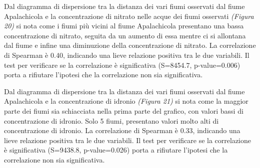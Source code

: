 \documentclass{article} %
\begin{document}
Dal diagramma di dispersione tra la distanza dei vari fiumi osservati dal fiume Apalachicola e la concentrazione di nitrato nelle acque dei fiumi osservati \textit{(Figura 20)} si nota come i fiumi più vicini al fiume Apalachicola presentano una bassa concentrazione di nitrato, seguita da un aumento di essa mentre ci si allontana dal fiume e infine una diminuzione della concentrazione di nitrato.
La correlazione di Spearman è 0.40, indicando una lieve relazione positiva tra le due variabili. 
Il test per verificare se la correlazione è significativa (S=8454.7, p-value=0.006) porta a rifiutare l'ipotesi che la correlazione non sia significativa.

Dal diagramma di dispersione tra la distanza dei vari fiumi osservati dal fiume Apalachicola e la concentrazione di idronio \textit{(Figura 21)} si nota come la maggior parte dei fiumi sia schiacciata nella prima parte del grafico, con valori bassi di concentrazione di idronio. Solo 5 fiumi, presentano valori molto alti di concentrazione di idronio.
La correlazione di Spearman è 0.33, indicando una lieve relazione positiva tra le due variabili. 
Il test per verificare se la correlazione è significativa (S=9438.8, p-value=0.026) porta a rifiutare l'ipotesi che la correlazione non sia significativa.
\end{document}
